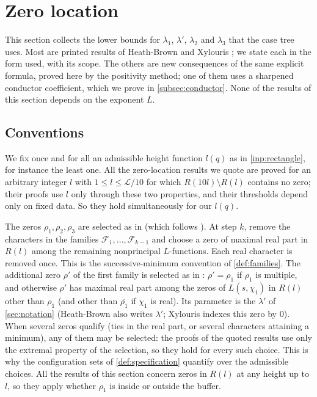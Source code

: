 \documentclass[11pt]{amsart}
\numberwithin{equation}{section}
\theoremstyle{plain}
\theoremstyle{definition}
\theoremstyle{remark}
\newcommand{\LL}{\mathcal{L}}
\newcommand{\1}{\mathbf{1}}
\begin{document}
\section{Zero location}\label{sec:location}

This section collects the lower bounds for $\lambda_1$, $\lambda'$, $\lambda_2$ and $\lambda_3$ that the
case tree uses. Most are printed results of Heath-Brown \cite{HeathBrown1992zero} and Xylouris
\cite{Xylouris2011nullstellen}; we state each in the form used, with its scope. The others are new
consequences of the same explicit formula, proved here by the positivity method; one of them uses
a sharpened conductor coefficient, which we prove in \cref{subsec:conductor}. None of the results of
this section depends on the exponent $L$.

\subsection{Conventions}\label{subsec:locconventions}
We fix once and for all an admissible height function $l(q)$ as in \cref{inp:rectangle}, for
instance the least one. All the zero-location results we quote are proved for an arbitrary
integer $l$ with $1\le l\le\LL/10$ for which $R(10l)\setminus R(l)$ contains no zero; their proofs use
$l$ only through these two properties, and their thresholds depend only on fixed data. So they
hold simultaneously for our $l(q)$.

The zeros $\rho_1,\rho_2,\rho_3$ are selected as in \cite[(3.11)--(3.12), p.~21]{Xylouris2011nullstellen}
(which follows \cite[\S6]{HeathBrown1992zero}). At step $k$, remove the characters in the
families $\mathcal F_1,\ldots,\mathcal F_{k-1}$ and choose a zero of maximal real part
in $R(l)$ among the remaining nonprincipal $L$-functions. Each real character is
removed once. This is the successive-minimum convention of \cref{def:families}.
The additional zero
$\rho'$ of the first family is selected as in \cite[pp.~21--22]{Xylouris2011nullstellen}: $\rho'=\rho_1$ if
$\rho_1$ is multiple, and otherwise $\rho'$ has maximal real part among the zeros of $L(s,\chi_1)$ in
$R(l)$ other than $\rho_1$ (and other than $\overline{\rho_1}$ if $\chi_1$ is real). Its parameter is the
$\lambda'$ of \cref{sec:notation} (Heath-Brown also writes $\lambda'$; Xylouris indexes this zero by $0$). When several zeros qualify
(ties in the real part, or several characters attaining a minimum), any of them may be selected:
the proofs of the quoted results use only the extremal property of the selection, so they hold for
every such choice. This is why the configuration sets of \cref{def:specification} quantify over the
admissible choices. All the results of this section concern zeros in $R(l)$ at any height up to
$l$, so they apply whether $\rho_1$ is inside or outside the buffer.
\end{document}
